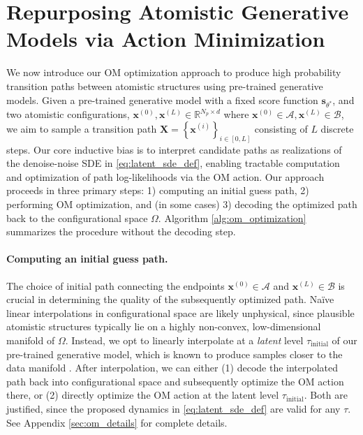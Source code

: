 \vspace{-5pt}
\section{Repurposing Atomistic Generative Models via Action Minimization}
\label{sec:main_method}
We now introduce our OM optimization approach to produce high probability transition paths between atomistic structures using pre-trained generative models. Given a pre-trained generative model with a fixed score function $\mathbf{s}_{\theta^*}$, and two atomistic configurations, $\mathbf{x}^{(0)}, \mathbf{x}^{(L)} \in \mathbb{R}^{N_p \times d}$ where $\mathbf{x}^{(0)} \in \mathcal{A}, \mathbf{x}^{(L)} \in \mathcal{B}$, we aim to sample a transition path $\mathbf{X} = \left\{ \mathbf{x}^{(i)} \right\}_{i \in \left[0, L \right]}$ consisting of $L$ discrete steps. Our core inductive bias is to interpret candidate paths as realizations of the denoise-noise SDE in \eqref{eq:latent_sde_def}, enabling tractable computation and optimization of path log-likelihoods via the OM action. Our approach proceeds in three primary steps: 1) computing an initial guess path, 2) performing OM optimization, and (in some cases) 3) decoding the optimized path back to the configurational space $\Omega$. Algorithm \ref{alg:om_optimization} summarizes the procedure without the decoding step.
\vspace{-5pt}
\paragraph{Computing an initial guess path.}
The choice of initial path connecting the endpoints $\mathbf{x}^{(0)} \in \mathcal{A}$ and $\mathbf{x}^{(L)} \in \mathcal{B}$ is crucial in determining the quality of the subsequently optimized path. Na\"ive linear interpolations in configurational space are likely unphysical, since plausible atomistic structures typically lie on a highly non-convex, low-dimensional manifold of $\Omega$. Instead, we opt to linearly interpolate at a \textit{latent} level $\tau_\text{initial}$ of our pre-trained generative model, which is known to produce samples closer to the data manifold \citep{ho2020denoising}. After interpolation, we can either (1) decode the interpolated path back into configurational space and subsequently optimize the OM action there, or (2) directly optimize the OM action at the latent level $\tau_{\text{initial}}$. Both are justified, since the proposed dynamics in \eqref{eq:latent_sde_def} are valid for any $\tau$. See Appendix \ref{sec:om_details} for complete details. 
\vspace{-5pt}
